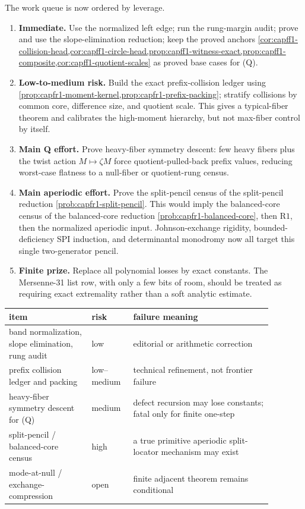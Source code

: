 \documentclass[11pt]{article}
\theoremstyle{definition}
\theoremstyle{remark}
\providecommand{\Rone}{\mathrm{R1}}
\begin{document}
The work queue is now ordered by leverage.
\begin{enumerate}[label=\textup{(\arabic*)},leftmargin=2.4em]
\item \textbf{Immediate.} Use the normalized left edge; run the rung-margin audit; prove and use the slope-elimination reduction; keep the proved anchors \cref{cor:capff1-collision-head,cor:capff1-circle-head,prop:capff1-witness-exact,prop:capff1-composite,cor:capff1-quotient-scales} as proved base cases for \textup{(Q)}.
\item \textbf{Low-to-medium risk.} Build the exact prefix-collision ledger using \cref{prop:capfr1-moment-kernel,prop:capfr1-prefix-packing}; stratify collisions by common core, difference size, and quotient scale.  This gives a typical-fiber theorem and calibrates the high-moment hierarchy, but not max-fiber control by itself.
\item \textbf{Main Q effort.} Prove heavy-fiber symmetry descent: few heavy fibers plus the twist action \(M\mapsto\zeta M\) force quotient-pulled-back prefix values, reducing worst-case flatness to a null-fiber or quotient-rung census.
\item \textbf{Main aperiodic effort.} Prove the split-pencil census of the split-pencil reduction \cref{prob:capfr1-split-pencil}.  This would imply the balanced-core census of the balanced-core reduction \cref{prob:capfr1-balanced-core}, then \(\Rone\), then the normalized aperiodic input.  Johnson-exchange rigidity, bounded-deficiency SPI induction, and determinantal monodromy now all target this single two-generator pencil.
\item \textbf{Finite prize.} Replace all polynomial losses by exact constants.  The Mersenne-31 list row, with only a few bits of room, should be treated as requiring exact extremality rather than a soft analytic estimate.
\end{enumerate}

\begin{center}
\small
\begin{tabular}{|p{0.28\linewidth}|p{0.13\linewidth}|p{0.47\linewidth}|}
\hline
item & risk & failure meaning\\
\hline
band normalization, slope elimination, rung audit & low & editorial or arithmetic correction\\
\hline
prefix collision ledger and packing & low--medium & technical refinement, not frontier failure\\
\hline
heavy-fiber symmetry descent for \textup{(Q)} & medium & defect recursion may lose constants; fatal only for finite one-step\\
\hline
split-pencil / balanced-core census & high & a true primitive aperiodic split-locator mechanism may exist\\
\hline
mode-at-null / exchange-compression & open & finite adjacent theorem remains conditional\\
\hline
\end{tabular}
\end{center}
\end{document}
